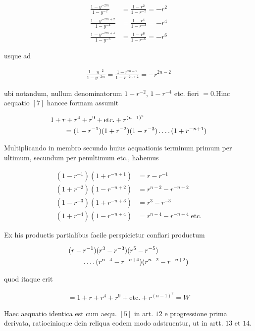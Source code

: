 \[
\begin{aligned}
\frac{1-y^{-2m}}{1-y^{-2}}&=\frac{1-r^2}{1-r^{-2}}=-r^2\\
\frac{1-y^{-2m+2}}{1-y^{-4}}&=\frac{1-r^4}{1-r^{-4}}=-r^4\\
\frac{1-y^{-2m+4}}{1-y^{-6}}&=\frac{1-r^6}{1-r^{-6}}=-r^6
\end{aligned}
\]

usque ad

\[
\begin{aligned}
\frac{1-y^{-2}}{1-y^{-2m}}=\frac{1-r^{2n-2}}{1-r^{-2n+2}}=-r^{2n-2}
\end{aligned}
\]

ubi notandum, nullum denominatorum $1-r^{-2}$, $1-r^{-4}$ etc. fieri $=0$.\quad Hinc aequatio $[7]$ hancce formam assumit

\[
\begin{aligned}
&1+r+r^4+r^9+\text{etc.}+r^{(n-1)^2}\\&\qquad=(1-r^{-1})(1+r^{-2})(1-r^{-3})\mathinner{.\,.\,.\,.}(1+r^{-n+1})
\end{aligned}
\]

Multiplicando in membro secundo huius aequationis terminum primum per ultimum, secundum per penultimum etc., habemus

\[
\begin{aligned}
(1-r^{-1})(1+r^{-n+1})&=r-r^{-1}\\
(1+r^{-2})(1-r^{-n+2})&=r^{n-2}-r^{-n+2}\\
(1-r^{-3})(1+r^{-n+3})&=r^3-r^{-3}\\
(1+r^{-4})(1-r^{-n+4})&=r^{n-4}-r^{-n+4}\;\text{etc.}
\end{aligned}
\]

Ex his productis partialibus facile perspicietur conflari productum

\[
\begin{aligned}
&(r-r^{-1})(r^3-r^{-3})(r^5-r^{-5})\\&\qquad\mathinner{.\,.\,.\,.}(r^{n-4}-r^{-n+4})(r^{n-2}-r^{-n+2})
\end{aligned}
\]

quod itaque erit

\[
\begin{aligned}
=1+r+r^4+r^9+\text{etc.}+r^{(n-1)^2}=W
\end{aligned}
\]

Haec aequatio identica est cum aequ. $[5]$ in art. $12$ e progressione prima derivata, ratiociniaque dein reliqua eodem modo adstruentur, ut in artt. $13$ et $14$.

